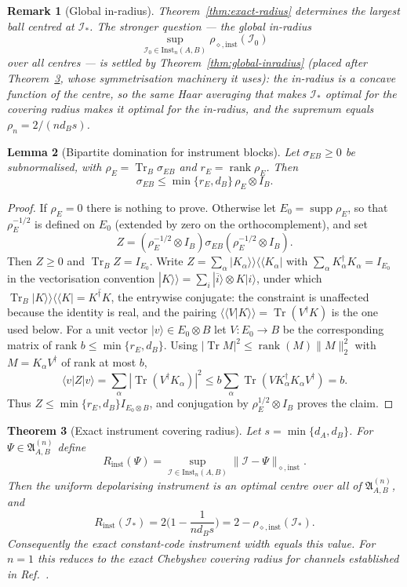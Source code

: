 \documentclass[11pt,a4paper]{article}
\newtheorem{theorem}{Theorem}[section]
\newtheorem{lemma}[theorem]{Lemma}
\newtheorem{remark}[theorem]{Remark}
\newcommand{\Inst}{\mathrm{Inst}}
\newcommand{\Tr}{\operatorname{Tr}}
\newcommand{\supp}{\operatorname{supp}}
\newcommand{\rank}{\operatorname{rank}}
\begin{document}
\begin{remark}[Global in-radius]
\label{rem:global-inradius}
Theorem~\ref{thm:exact-radius} determines the largest ball centred at $\mathcal I_*$. The stronger question --- the global in-radius
\[
\sup_{\mathcal I_0\in\Inst_n(A,B)}\rho_{\diamond,\mathrm{inst}}(\mathcal I_0)
\]
over all centres --- is settled by Theorem~\ref{thm:global-inradius} (placed after Theorem~\ref{thm:covering}, whose symmetrisation machinery it uses): the in-radius is a concave function of the centre, so the same Haar averaging that makes $\mathcal I_*$ optimal for the covering radius makes it optimal for the in-radius, and the supremum equals $\rho_n=2/(nd_Bs)$.
\end{remark}

\begin{lemma}[Bipartite domination for instrument blocks]
\label{lem:domination}
Let $\sigma_{EB}\ge0$ be subnormalised, with $\rho_E=\Tr_B\sigma_{EB}$ and $r_E=\rank\rho_E$. Then
\[
\sigma_{EB}\le\min\{r_E,d_B\}\,\rho_E\otimes I_B.
\]
\end{lemma}

\begin{proof}
If $\rho_E=0$ there is nothing to prove. Otherwise let $E_0=\supp\rho_E$, so that $\rho_E^{-1/2}$ is defined on $E_0$ (extended by zero on the orthocomplement), and set
\[
Z=(\rho_E^{-1/2}\otimes I_B)\sigma_{EB}(\rho_E^{-1/2}\otimes I_B).
\]
Then $Z\ge0$ and $\Tr_BZ=I_{E_0}$. Write $Z=\sum_\alpha|K_\alpha\rangle\!\rangle\langle\!\langle K_\alpha|$ with $\sum_\alpha K_\alpha^\dagger K_\alpha=I_{E_0}$ in the vectorisation convention $|K\rangle\!\rangle=\sum_i|\overline i\rangle\otimes K|i\rangle$, under which $\Tr_B|K\rangle\!\rangle\langle\!\langle K|=\overline{K^\dagger K}$, the entrywise conjugate: the constraint is unaffected because the identity is real, and the pairing $\langle\!\langle V|K\rangle\!\rangle=\Tr(V^\dagger K)$ is the one used below. For a unit vector $|v\rangle\in E_0\otimes B$ let $V:E_0\to B$ be the corresponding matrix of rank $b\le\min\{r_E,d_B\}$. Using $|\Tr M|^2\le\rank(M)\|M\|_2^2$ with $M=K_\alpha V^\dagger$ of rank at most $b$,
\[
\langle v|Z|v\rangle
=\sum_\alpha|\Tr(V^\dagger K_\alpha)|^2
\le b\sum_\alpha\Tr(VK_\alpha^\dagger K_\alpha V^\dagger)=b.
\]
Thus $Z\le\min\{r_E,d_B\}I_{E_0\otimes B}$, and conjugation by $\rho_E^{1/2}\otimes I_B$ proves the claim.
\end{proof}

\begin{theorem}[Exact instrument covering radius]
\label{thm:covering}
Let $s=\min\{d_A,d_B\}$. For $\Psi\in\mathfrak A_{A,B}^{(n)}$ define
\[
R_{\mathrm{inst}}(\Psi)=\sup_{\mathcal I\in\Inst_n(A,B)}\|\mathcal I-\Psi\|_{\diamond,\mathrm{inst}}.
\]
Then the uniform depolarising instrument is an optimal centre over all of $\mathfrak A_{A,B}^{(n)}$, and
\[
R_{\mathrm{inst}}(\mathcal I_*)=2\Big(1-\frac1{nd_Bs}\Big)=2-\rho_{\diamond,\mathrm{inst}}(\mathcal I_*).
\]
Consequently the exact constant-code instrument width equals this value. For $n=1$ this reduces to the exact Chebyshev covering radius for channels established in Ref.~\cite{CompanionChannels}.
\end{theorem}
\end{document}
